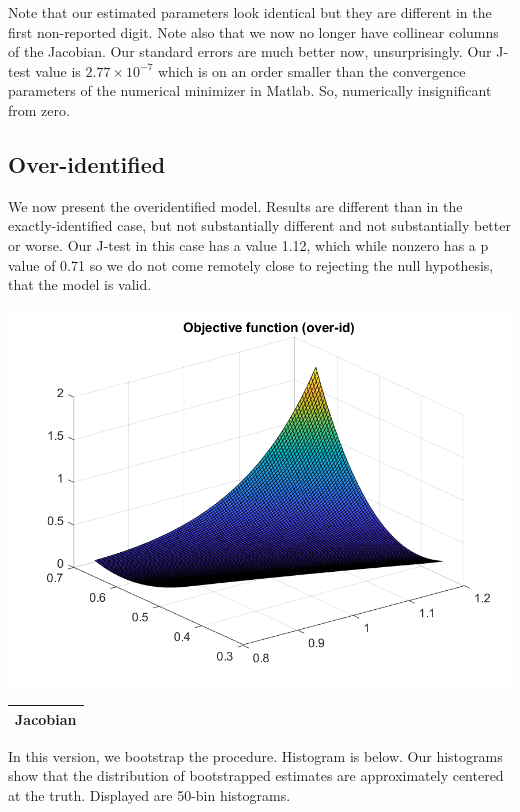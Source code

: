 \documentclass[11pt]{article} %
\begin{document}
Note that our estimated parameters look identical but they are different in the first non-reported digit. Note also that we now no longer have collinear columns of the Jacobian. Our standard errors are much better now, unsurprisingly. Our J-test value is $2.77 \times 10^{-7}$ which is on an order smaller than the convergence parameters of the numerical minimizer in Matlab. So, numerically insignificant from zero.

\subsection{Over-identified}

We now present the overidentified model. Results are different than in the exactly-identified case, but not substantially different and not substantially better or worse. Our J-test in this case has a value 1.12, which while nonzero has a p value of 0.71 so we do not come remotely close to rejecting the null hypothesis, that the model is valid.

\includegraphics{obj_ov}

\begin{center}


\begin{tabular}{cc}
\hline
\multicolumn{2}{c}{Jacobian} \\
\hline

\hline
\end{tabular}
\end{center}

In this version, we bootstrap the procedure. Histogram is below. Our histograms show that the distribution of bootstrapped estimates are approximately centered at the truth. Displayed are 50-bin histograms.
\end{document}

